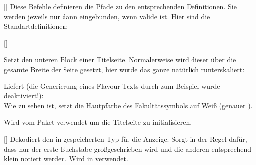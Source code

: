 %
%
%

[\cmdlist\secline{}]
Diese Befehle definieren die Pfade zu den entsprechenden Definitionen. Sie werden jeweils nur dann eingebunden, wenn  valide ist.
Hier sind die Standartdefinitionen:
\begin{latex}
\providecommand{\LILLYxColorxTITLExSETTINGSxGENERAL}{%
  \LILLYxPATHxDATA/Semester/Definitions/GENERAL.tex%
}
\providecommand{\LILLYxColorxTITLExSETTINGSxVORLESUNG}{%
  \LILLYxPATHxDATA/Semester/Definitions/%
    \LILLYxVorlesung%
}
\end{latex}

%
%
%

[\secline{}\secline{}]

Setzt den unteren Block einer Titelseite. Normalerweise wird dieser über die gesamte Breite der Seite gesetzt, hier wurde das ganze natürlich runterskaliert:
Liefert (die Generierung eines Flavour Texts durch zum Beispiel  wurde deaktiviert!):\\
{
\def\LILLYxFACULTY{\LILLYxFACULTYxMATHE}
\def\LILLYxFACULTYxCOLOR{FacultyMathexColor}
}
Wie zu sehen ist, setzt  die Hautpfarbe des Fakultätssymbols auf Weiß (genauer ).

%
%
%

Wird vom Paket verwendet um die Titelseite zu initialisieren.

%
%
%

[]
Dekodiert den in  gespeicherten Typ für die Anzeige. Sorgt in der Regel dafür, dass nur der erste Buchstabe großgeschrieben wird und die anderen entsprechend klein notiert werden. Wird in  verwendet.


